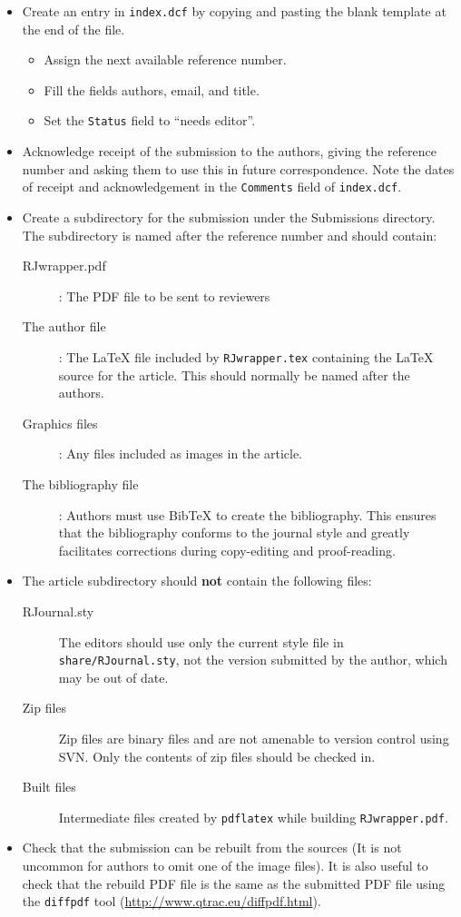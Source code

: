 \documentclass[11pt]{article}
\begin{document}
\begin{itemize}
\item Create an entry in \texttt{index.dcf} by copying and pasting the
  blank template at the end of the file.
  \begin{itemize}
  \item Assign the next available reference number.
  \item Fill the  fields authors, email, and title.
  \item Set the \texttt{Status} field to ``needs editor''.
  \end{itemize}
\item Acknowledge receipt of the submission to the authors, giving the
  reference number and asking them to use this in future
  correspondence.  Note the dates of receipt and acknowledgement in
  the \texttt{Comments} field of \texttt{index.dcf}.
\item Create a subdirectory for the submission under the Submissions
  directory.  The subdirectory is named after the reference number and
  should contain:
  \begin{description}
  \item[RJwrapper.pdf]: The PDF file to be sent to reviewers
  \item[The author file]: The LaTeX file included by \texttt{RJwrapper.tex}
    containing the LaTeX source for the article. This should normally
    be named after the authors.
  \item[Graphics files]: Any files included as images in the article.
  \item[The bibliography file]: Authors must use BibTeX to create the
    bibliography. This ensures that the bibliography conforms to the 
    journal style and greatly facilitates corrections during copy-editing
    and proof-reading.
  \end{description}
\item The article subdirectory should {\bf not} contain the following files:
  \begin{description}
  \item[RJournal.sty] The editors should use only the current style
    file in \texttt{share/RJournal.sty}, not the version submitted by
    the author, which may be out of date.
  \item[Zip files] Zip files are binary files and are not amenable to
    version control using SVN. Only the contents of zip files should
    be checked in.
  \item[Built files] Intermediate files created by \texttt{pdflatex}
    while building \texttt{RJwrapper.pdf}.
  \end{description}
\item Check that the submission can be rebuilt from the sources (It is
  not uncommon for authors to omit one of the image files). It is also
  useful to check that the rebuild PDF file is the same as the
  submitted PDF file using the \texttt{diffpdf} tool
  (\url{http://www.qtrac.eu/diffpdf.html}).
\end{itemize}
\end{document}
